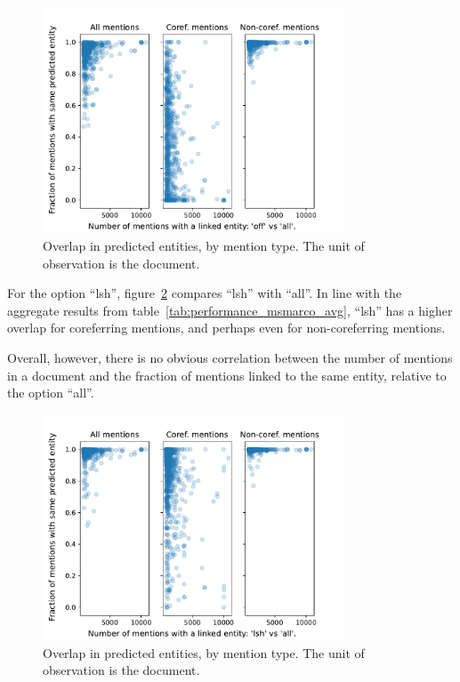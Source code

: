 \documentclass[a4paper,11pt]{article}
\numberwithin{equation}{section} %
\begin{document}
\begin{figure}[H]
  \centering
  \includegraphics[width = 0.8\textwidth]{../figs/msmarco_overlap_off.pdf}
  \caption{Overlap in predicted entities, by mention type. The unit of observation is the document.}
  \label{fig:msmarco_overlap_off}
\end{figure}

For the option ``lsh'', figure~\ref{fig:msmarco_overlap_lsh} compares ``lsh'' with ``all''. In line with the aggregate results from table~\ref{tab:performance_msmarco_avg}, ``lsh'' has a higher overlap for coreferring mentions, and perhaps even for non-coreferring mentions.

Overall, however, there is no obvious correlation between the number of mentions in a document and the fraction of mentions linked to the same entity, relative to the option ``all''. 

\begin{figure}[H]
  \centering
  \includegraphics[width = 0.8\textwidth]{../figs/msmarco_overlap_lsh.pdf}
  \caption{Overlap in predicted entities, by mention type. The unit of observation is the document.}
  \label{fig:msmarco_overlap_lsh}
\end{figure}
\end{document}
